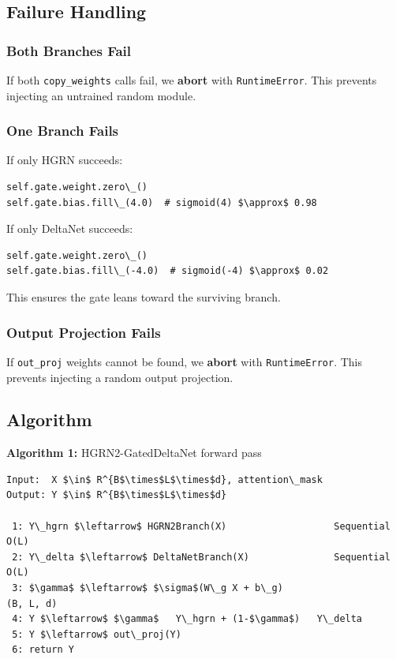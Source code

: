 \subsection{Failure Handling}

\subsubsection{Both Branches Fail}

If both \texttt{copy\_weights} calls fail, we \textbf{abort} with \texttt{RuntimeError}. This 
prevents injecting an untrained random module.

\subsubsection{One Branch Fails}

If only HGRN succeeds:
\begin{lstlisting}
self.gate.weight.zero\_()
self.gate.bias.fill\_(4.0)  # sigmoid(4) $\approx$ 0.98
\end{lstlisting}

If only DeltaNet succeeds:
\begin{lstlisting}
self.gate.weight.zero\_()
self.gate.bias.fill\_(-4.0)  # sigmoid(-4) $\approx$ 0.02
\end{lstlisting}

This ensures the gate leans toward the surviving branch.

\subsubsection{Output Projection Fails}

If \texttt{out\_proj} weights cannot be found, we \textbf{abort} with \texttt{RuntimeError}. 
This prevents injecting a random output projection.

\subsection{Algorithm}

\textbf{Algorithm 1:} HGRN2-GatedDeltaNet forward pass
\begin{lstlisting}
Input:  X $\in$ R^{B$\times$L$\times$d}, attention\_mask
Output: Y $\in$ R^{B$\times$L$\times$d}

 1: Y\_hgrn $\leftarrow$ HGRN2Branch(X)                   Sequential O(L)
 2: Y\_delta $\leftarrow$ DeltaNetBranch(X)               Sequential O(L)
 3: $\gamma$ $\leftarrow$ $\sigma$(W\_g X + b\_g)                        (B, L, d)
 4: Y $\leftarrow$ $\gamma$   Y\_hgrn + (1-$\gamma$)   Y\_delta
 5: Y $\leftarrow$ out\_proj(Y)
 6: return Y
\end{lstlisting}

